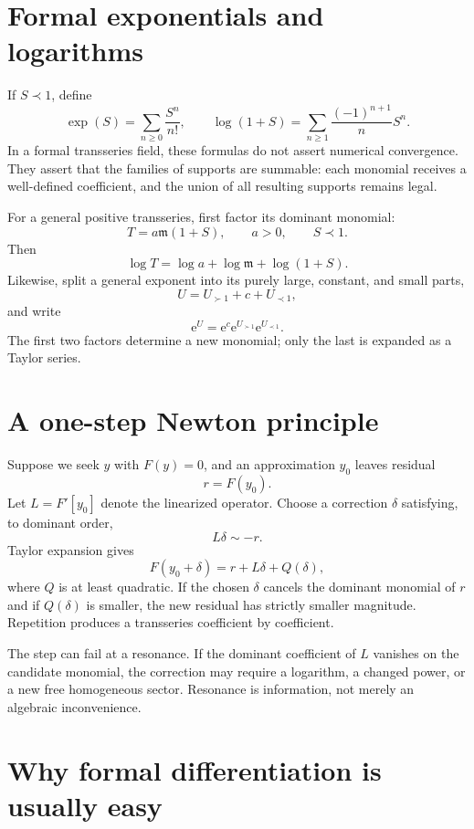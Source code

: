 \documentclass[11pt,openany]{book}
\theoremstyle{plain}
\theoremstyle{definition}
\theoremstyle{remark}
\newcommand{\m}{\mathfrak{m}}
\newcommand{\e}{\mathrm{e}}
\begin{document}
\section{Formal exponentials and logarithms}

If $S\prec1$, define
\[
 \exp(S)=\sum_{n\ge0}\frac{S^n}{n!},
 \qquad
 \log(1+S)=\sum_{n\ge1}\frac{(-1)^{n+1}}{n}S^n.
\]
In a formal transseries field, these formulas do not assert numerical convergence. They assert that the families of supports are summable: each monomial receives a well-defined coefficient, and the union of all resulting supports remains legal.

For a general positive transseries, first factor its dominant monomial:
\[
 T=a\m(1+S),
 \qquad a>0,
 \qquad S\prec1.
\]
Then
\[
 \log T=\log a+\log\m+\log(1+S).
\]
Likewise, split a general exponent into its purely large, constant, and small parts,
\[
 U=U_{\succ1}+c+U_{\prec1},
\]
and write
\[
 \e^U=\e^c\e^{U_{\succ1}}\e^{U_{\prec1}}.
\]
The first two factors determine a new monomial; only the last is expanded as a Taylor series.

\section{A one-step Newton principle}

Suppose we seek $y$ with $F(y)=0$, and an approximation $y_0$ leaves residual
\[
 r=F(y_0).
\]
Let $L=F'[y_0]$ denote the linearized operator. Choose a correction $\delta$ satisfying, to dominant order,
\[
 L\delta\sim-r.
\]
Taylor expansion gives
\[
 F(y_0+\delta)=r+L\delta+Q(\delta),
\]
where $Q$ is at least quadratic. If the chosen $\delta$ cancels the dominant monomial of $r$ and if $Q(\delta)$ is smaller, the new residual has strictly smaller magnitude. Repetition produces a transseries coefficient by coefficient.

\begin{warningbox}
The step can fail at a resonance. If the dominant coefficient of $L$ vanishes on the candidate monomial, the correction may require a logarithm, a changed power, or a new free homogeneous sector. Resonance is information, not merely an algebraic inconvenience.
\end{warningbox}

\section{Why formal differentiation is usually easy}
\end{document}
